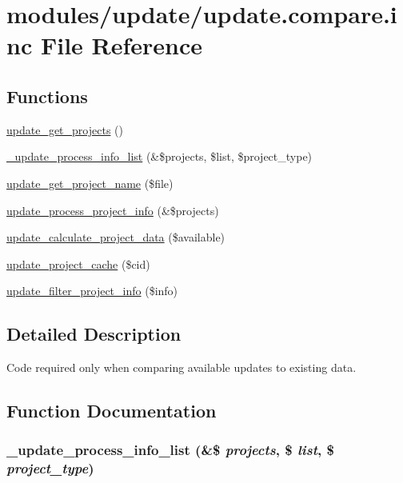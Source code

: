 \hypertarget{update_8compare_8inc}{
\section{modules/update/update.compare.inc File Reference}
\label{update_8compare_8inc}
}
\subsection*{Functions}
\begin{CompactItemize}
\item 
\hyperlink{update_8compare_8inc_7e1ea49d91f2d2b81b8101d481d10300}{update\_\-get\_\-projects} ()
\item 
\hyperlink{update_8compare_8inc_2b2d551dec351632628042f08882244f}{\_\-update\_\-process\_\-info\_\-list} (\&\$projects, \$list, \$project\_\-type)
\item 
\hyperlink{update_8compare_8inc_02c561b213ab3df2e929917736dc2b7b}{update\_\-get\_\-project\_\-name} (\$file)
\item 
\hyperlink{update_8compare_8inc_d14173209d3e9cf76fbd6d6d1977de05}{update\_\-process\_\-project\_\-info} (\&\$projects)
\item 
\hyperlink{update_8compare_8inc_a0663304dc4634e4109c896f214ea791}{update\_\-calculate\_\-project\_\-data} (\$available)
\item 
\hyperlink{update_8compare_8inc_958705ecce49b020722280decff3f644}{update\_\-project\_\-cache} (\$cid)
\item 
\hyperlink{update_8compare_8inc_8d1c29cf668adf2ea2a1a34f0f716cd1}{update\_\-filter\_\-project\_\-info} (\$info)
\end{CompactItemize}


\subsection{Detailed Description}
Code required only when comparing available updates to existing data. 

\subsection{Function Documentation}
\hypertarget{update_8compare_8inc_2b2d551dec351632628042f08882244f}{
\subsubsection[{\_\-update\_\-process\_\-info\_\-list}]{\setlength{\rightskip}{0pt plus 5cm}\_\-update\_\-process\_\-info\_\-list (\&\$ {\em projects}, \/  \$ {\em list}, \/  \$ {\em project\_\-type})}}
\label{update_8compare_8inc_2b2d551dec351632628042f08882244f}


